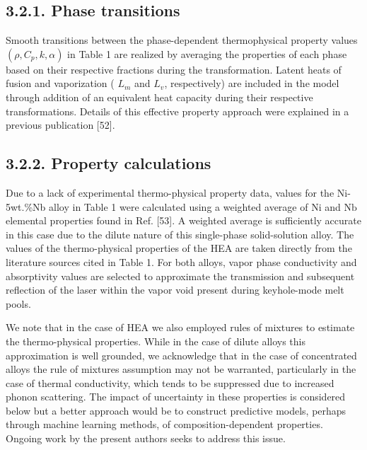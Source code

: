 \documentclass[10pt]{article}
\begin{document}
\subsection*{3.2.1. Phase transitions}
Smooth transitions between the phase-dependent thermophysical property values $\left(\rho, C_{p}, k, \alpha\right)$ in Table 1 are realized by averaging the properties of each phase based on their respective fractions during the transformation. Latent heats of fusion and vaporization ( $L_{m}$ and $L_{v}$, respectively) are included in the model through addition of an equivalent heat capacity during their respective transformations. Details of this effective property approach were explained in a previous publication [52].

\subsection*{3.2.2. Property calculations}
Due to a lack of experimental thermo-physical property data, values for the Ni-5wt.\%Nb alloy in Table 1 were calculated using a weighted average of $\mathrm{Ni}$ and $\mathrm{Nb}$ elemental properties found in Ref. [53]. A weighted average is sufficiently accurate in this case due to the dilute nature of this single-phase solid-solution alloy. The values of the thermo-physical properties of the HEA are taken directly from the literature sources cited in Table 1. For both alloys, vapor phase conductivity and absorptivity values are selected to approximate the transmission and subsequent reflection of the laser within the vapor void present during keyhole-mode melt pools.

We note that in the case of HEA we also employed rules of mixtures to estimate the thermo-physical properties. While in the case of dilute alloys this approximation is well grounded, we acknowledge that in the case of concentrated alloys the rule of mixtures assumption may not be warranted, particularly in the case of thermal conductivity, which tends to be suppressed due to increased phonon scattering. The impact of uncertainty in these properties is considered below but a better approach would be to construct predictive models, perhaps through machine learning methods, of composition-dependent properties. Ongoing work by the present authors seeks to address this issue.
\end{document}
